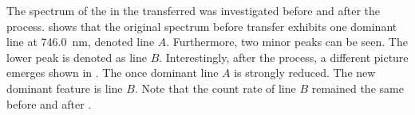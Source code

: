 	The spectrum of the \siv in the transferred \nd was investigated before and after the \pp process.  shows that the original spectrum before \nd transfer exhibits one dominant line at \SI{746.0}{nm}, denoted line $A$. Furthermore, two minor peaks can be seen. The lower \wl peak is denoted as line $B$. Interestingly, after the \pp process, a different picture emerges shown in . The once dominant line $A$ is strongly reduced. The new dominant feature is line $B$. Note that the count rate of line $B$ remained the same before and after \pp.


	\begin{figure}[htp]
		\begin{subfigure}[t]{ 0.49\linewidth}
			\centering
			\caption{}
			\label{subfig::spectrum_diamond_for_vcsel_before_pp}
		\end{subfigure}
		\hfill
		\begin{subfigure}[t]{ 0.49\linewidth}
			\centering

\end{subfigure}
\end{figure}
